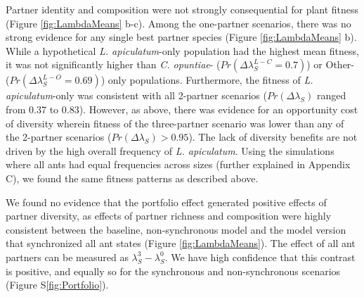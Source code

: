 \documentclass[11pt]{article}
\begin{document}
Partner identity and composition were not strongly consequential for plant fitness (Figure \ref{fig:LambdaMeans} b-c). 
Among the one-partner scenarios, there was no strong evidence for any single best partner species (Figure \ref{fig:LambdaMeans} b). 
While a hypothetical \textit{L. apiculatum}-only population had the highest mean fitness, it was not significantly higher than \textit{C. opuntiae}-  ($Pr(\Delta\lambda^{L-C}_{S}=0.7)$) or Other- ($Pr(\Delta\lambda^{L-O}_{S}=0.69)$) only populations. 
Furthermore, the fitness of \textit{L. apiculatum}-only was consistent with all 2-partner scenarios ($Pr(\Delta\lambda_{S})$ ranged from 0.37 to 0.83).
However, as above, there was evidence for an opportunity cost of diversity wherein fitness of the three-partner scenario was lower than any of the 2-partner scenarios ($Pr(\Delta\lambda_{S})>0.95$). 
The lack of diversity benefits are not driven by the high overall frequency of \textit{L. apiculatum}. 
Using the simulations where all ants had equal frequencies across sizes (further explained in Appendix C), we found the same fitness patterns as described above.

We found no evidence that the portfolio effect generated positive effects of partner diversity, as effects of partner richness and composition were highly consistent between the baseline, non-synchronous model and the model version that synchronized all ant states (Figure \ref{fig:LambdaMeans}).
The effect of all ant partners can be measured as $\lambda^{3}_{S} - \lambda^{0}_{S}$.
We have high confidence that this contrast is positive, and equally so for the synchronous and non-synchronous scenarios (Figure S\ref{fig:Portfolio}).
\end{document}
